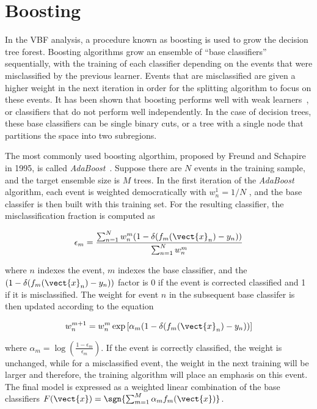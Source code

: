 \section{Boosting}

In the VBF analysis, a procedure known as boosting is used to grow
the decision tree forest. Boosting algorithms grow an ensemble of
``base classifiers'' sequentially, with the training of each classifier
depending on the events that were misclassified by the previous
learner. Events that are misclassified are given a higher weight in
the next iteration in order for the splitting algorithm to focus on
these events. It has been shown that boosting performs well with weak
learners~\cite{bib:Schapire:1990:SWL:83637.83645}, or classifiers that do not perform well
independently. In the case of decision trees, these base classifiers can
be single binary cuts, or a tree with a single node that partitions
the space into two subregions. 

The most commonly used boosting algorthim, proposed by Freund and
Schapire in 1995, is called
\textit{AdaBoost}~\cite{bib:Freund:1995:DGO:646943.712093}. Suppose there
are $N$ events in the training sample, and the target ensemble size is
$M$ trees. In the first iteration of the \textit{AdaBoost} algorithm,
each event is weighted democratically with $w_n^{1} = 1/N$ , and the
base classifer is then built with this training set. For the resulting
classifier, the misclassification fraction is computed as

\begin{equation}
\label{chap:bdt:equation:error_fraction}
    \epsilon_m = \frac{\sum_{n=1}^{N} w_n^m (1-\delta(f_m(\vect{x}_n) -
      y_n))}{\sum_{n=1}^{N} w_n^m}
\end{equation}

\noindent where $n$ indexes the event, $m$ indexes the base classifier, and the
$(1-\delta(f_m(\vect{x}_n) - y_n))$ factor is 0 if the event is
corrected classified and 1 if it is misclassified. The weight for
event $n$ in the subsequent base classifer is then updated according
to the equation

\begin{equation}
\label{chap:bdt:equation:weight_update}
    w_n^{m+1}=w_n^{m}\exp{[\alpha_m (1-\delta(f_m(\vect{x}_n) - y_n))]}
\end{equation}

\noindent where $\alpha_m = \log{(\frac{1-\epsilon_m}{\epsilon_m})}$. If the event
is correctly classified, the weight is unchanged, while for a
misclassified event, the weight in the next training will be larger
and therefore, the training algorithm will place an emphasis on this
event. The final model is expressed as a weighted linear combination
of the base classifiers $F(\vect{x}) = \sgn{\sum_{m=1}^{M} \alpha_m f_m(\vect{x})}$.


